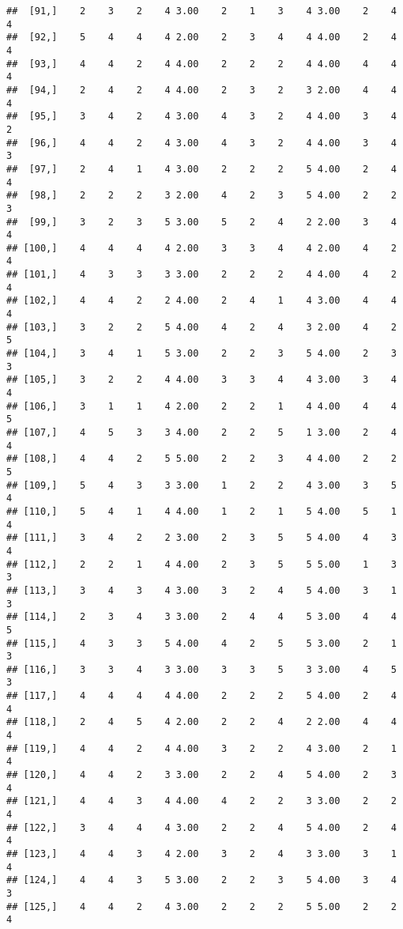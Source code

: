 \documentclass[]{article}
\begin{document}
\begin{verbatim}
##  [91,]    2    3    2    4 3.00    2    1    3    4 3.00    2    4    4
##  [92,]    5    4    4    4 2.00    2    3    4    4 4.00    2    4    4
##  [93,]    4    4    2    4 4.00    2    2    2    4 4.00    4    4    4
##  [94,]    2    4    2    4 4.00    2    3    2    3 2.00    4    4    4
##  [95,]    3    4    2    4 3.00    4    3    2    4 4.00    3    4    2
##  [96,]    4    4    2    4 3.00    4    3    2    4 4.00    3    4    3
##  [97,]    2    4    1    4 3.00    2    2    2    5 4.00    2    4    4
##  [98,]    2    2    2    3 2.00    4    2    3    5 4.00    2    2    3
##  [99,]    3    2    3    5 3.00    5    2    4    2 2.00    3    4    4
## [100,]    4    4    4    4 2.00    3    3    4    4 2.00    4    2    4
## [101,]    4    3    3    3 3.00    2    2    2    4 4.00    4    2    4
## [102,]    4    4    2    2 4.00    2    4    1    4 3.00    4    4    4
## [103,]    3    2    2    5 4.00    4    2    4    3 2.00    4    2    5
## [104,]    3    4    1    5 3.00    2    2    3    5 4.00    2    3    3
## [105,]    3    2    2    4 4.00    3    3    4    4 3.00    3    4    4
## [106,]    3    1    1    4 2.00    2    2    1    4 4.00    4    4    5
## [107,]    4    5    3    3 4.00    2    2    5    1 3.00    2    4    4
## [108,]    4    4    2    5 5.00    2    2    3    4 4.00    2    2    5
## [109,]    5    4    3    3 3.00    1    2    2    4 3.00    3    5    4
## [110,]    5    4    1    4 4.00    1    2    1    5 4.00    5    1    4
## [111,]    3    4    2    2 3.00    2    3    5    5 4.00    4    3    4
## [112,]    2    2    1    4 4.00    2    3    5    5 5.00    1    3    3
## [113,]    3    4    3    4 3.00    3    2    4    5 4.00    3    1    3
## [114,]    2    3    4    3 3.00    2    4    4    5 3.00    4    4    5
## [115,]    4    3    3    5 4.00    4    2    5    5 3.00    2    1    3
## [116,]    3    3    4    3 3.00    3    3    5    3 3.00    4    5    3
## [117,]    4    4    4    4 4.00    2    2    2    5 4.00    2    4    4
## [118,]    2    4    5    4 2.00    2    2    4    2 2.00    4    4    4
## [119,]    4    4    2    4 4.00    3    2    2    4 3.00    2    1    4
## [120,]    4    4    2    3 3.00    2    2    4    5 4.00    2    3    4
## [121,]    4    4    3    4 4.00    4    2    2    3 3.00    2    2    4
## [122,]    3    4    4    4 3.00    2    2    4    5 4.00    2    4    4
## [123,]    4    4    3    4 2.00    3    2    4    3 3.00    3    1    4
## [124,]    4    4    3    5 3.00    2    2    3    5 4.00    3    4    3
## [125,]    4    4    2    4 3.00    2    2    2    5 5.00    2    2    4

\end{verbatim}
\end{document}
